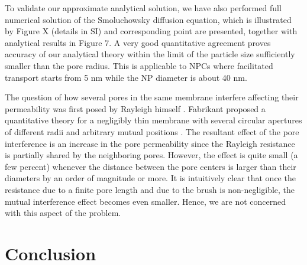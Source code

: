 \documentclass[12pt, a4paper]{article}
\begin{document}

To validate our approximate analytical solution, we have also performed full numerical solution of the Smoluchowsky diffusion equation, which is illustrated by Figure X 
(details in SI) and corresponding point are presented, together with analytical results in Figure 7. A very good quantitative agreement proves accuracy of our analytical theory
within the limit of the particle size sufficiently smaller than the pore radius. This is applicable to NPCs where facilitated transport starts from 5 nm while the
NP diameter is about 40 nm.

The question of how several pores in the same membrane interfere affecting their permeability was first posed by Rayleigh himself \cite{Strutt1878}. 
Fabrikant  proposed a quantitative theory for a negligibly thin membrane with several circular apertures of different radii and arbitrary mutual positions \cite{Fabrikant1985}. 
The resultant effect of the pore interference is an increase in the pore permeability since the Rayleigh resistance is partially shared by the neighboring pores. 
However, the effect is quite small (a few percent) whenever the distance between the pore centers is larger than their diameters by an order of magnitude or more. 
It is intuitively clear that once the resistance due to a finite pore length and due to the brush is non-negligible, the mutual interference effect 
becomes even smaller. Hence, we are not concerned with this aspect of the problem.



\section{Conclusion}
\end{document}
